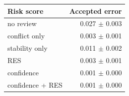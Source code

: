\begin{tabular}{lr}
\toprule
Risk score & Accepted error \\
\midrule
no review & 0.027 $\pm$ 0.003 \\
conflict only & 0.003 $\pm$ 0.001 \\
stability only & 0.011 $\pm$ 0.002 \\
RES & 0.003 $\pm$ 0.001 \\
confidence & 0.001 $\pm$ 0.000 \\
confidence + RES & 0.001 $\pm$ 0.000 \\
\bottomrule
\end{tabular}
